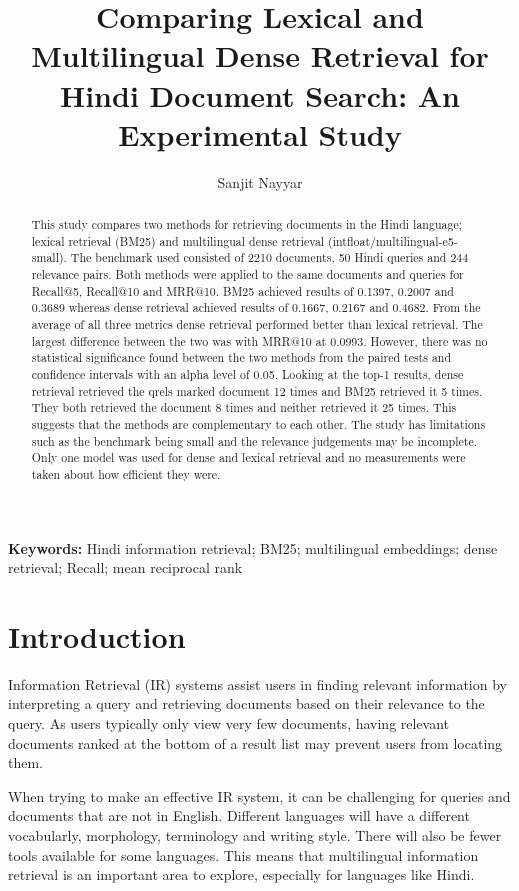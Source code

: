 \documentclass[10pt]{article}
\title{Comparing Lexical and Multilingual Dense Retrieval for Hindi Document Search: An Experimental Study}
\author{Sanjit Nayyar}
\date{}
\begin{document}
\maketitle

\begin{abstract}
This study compares two methods for retrieving documents in the Hindi language; lexical retrieval (BM25) and multilingual dense retrieval (intfloat/multilingual-e5-small). The benchmark used consisted of 2210 documents, 50 Hindi queries and 244 relevance pairs. Both methods were applied to the same documents and queries for Recall@5, Recall@10 and MRR@10. BM25 achieved results of 0.1397, 0.2007 and 0.3689 whereas dense retrieval achieved results of 0.1667, 0.2167 and 0.4682. From the average of all three metrics dense retrieval performed better than lexical retrieval. The largest difference between the two was with MRR@10 at 0.0993. However, there was no statistical significance found between the two methods from the paired tests and confidence intervals with an alpha level of 0.05. Looking at the top-1 results, dense retrieval retrieved the qrels marked document 12 times and BM25 retrieved it 5 times. They both retrieved the document 8 times and neither retrieved it 25 times. This suggests that the methods are complementary to each other. The study has limitations such as the benchmark being small and the relevance judgements may be incomplete. Only one model was used for dense and lexical retrieval and no measurements were taken about how efficient they were.
\end{abstract}

\noindent\textbf{Keywords:} Hindi information retrieval; BM25; multilingual embeddings; dense retrieval; Recall; mean reciprocal rank

\section{Introduction}
Information Retrieval (IR) systems assist users in finding relevant information by interpreting a query and retrieving documents based on their relevance to the query. As users typically only view very few documents, having relevant documents ranked at the bottom of a result list may prevent users from locating them.

When trying to make an effective IR system, it can be challenging for queries and documents that are not in English. Different languages will have a different vocabularly, morphology, terminology and writing style. There will also be fewer tools available for some languages. This means that multilingual information retrieval is an important area to explore, especially for languages like Hindi.
\end{document}
